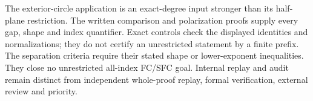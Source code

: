 \documentclass[11pt]{article}
\begin{document}
The exterior-circle application is an exact-degree input stronger
than its half-plane restriction.  The written comparison and
polarization proofs supply every gap, shape and index quantifier.
Exact controls check the displayed identities and normalizations;
they do not certify an unrestricted statement by a finite prefix.
The separation criteria require their stated shape or lower-exponent
inequalities. They close no unrestricted all-index FC/SFC goal.  Internal replay and audit remain
distinct from independent whole-proof replay, formal verification,
external review and priority.
\end{document}
